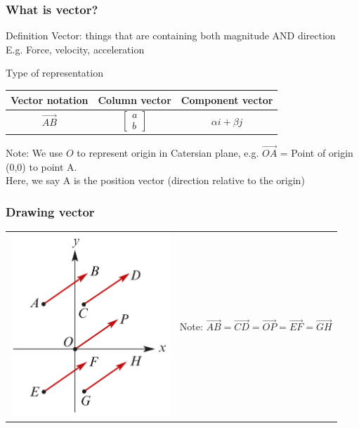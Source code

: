 \documentclass[
	11pt, %
]{beamer}
\begin{document}
\begin{frame}
    \frametitle{What is vector?}
    \begin{block}{Definition}
        Vector: things that are containing both magnitude AND direction\\
        E.g. Force, velocity, acceleration
    \end{block}
    \begin{block}{Type of representation}
        \centering
        \begin{tabular}{|c|c|c|}
            Vector notation & Column vector & Component vector\\
            \hline
            $\vec{AB}$ & $\begin{bmatrix}
                a\\
                b
            \end{bmatrix} $ & $\alpha i + \beta j$
        \end{tabular}
    \end{block}
    Note: We use $O$ to represent origin in Catersian plane, e.g. $\vec{OA}$ = Point of origin (0,0) to point A.\\
    Here, we say A is the position vector (direction relative to the origin)
\end{frame}

\begin{frame}
    \frametitle{Drawing vector}
    \centering
    \begin{tabular}{c c}
        \includegraphics[width = 6cm]{Directed.png} & Note: $\vec{AB} = \vec{CD} = \vec{OP} = \vec{EF} = \vec{GH}$
    \end{tabular}
\end{frame}
\end{document}

